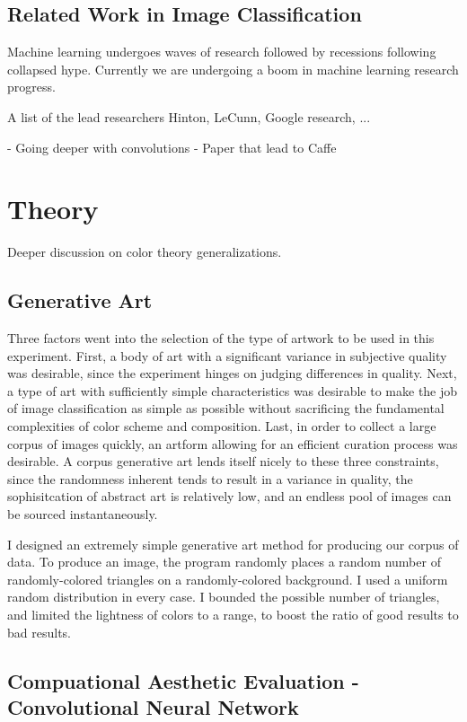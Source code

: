 \documentclass[midd]{thesis}
\begin{document}
\section{Related Work in Image Classification}

Machine learning undergoes waves of research followed by recessions following collapsed hype. Currently we are undergoing a boom in machine learning research progress.

A list of the lead researchers Hinton, LeCunn, Google research, ...

- Going deeper with convolutions
- Paper that lead to Caffe

\chapter{Theory}

Deeper discussion on color theory generalizations.

\section{Generative Art}

Three factors went into the selection of the type of artwork to be used in this experiment. First, a body of art with a significant variance in subjective quality was desirable, since the experiment hinges on judging differences in quality. Next, a type of art with sufficiently simple characteristics was desirable to make the job of image classification as simple as possible without sacrificing the fundamental complexities of color scheme and composition. Last, in order to collect a large corpus of images quickly, an artform allowing for an efficient curation process was desirable. A corpus generative art lends itself nicely to these three constraints, since the randomness inherent tends to result in a variance in quality, the sophisitcation of abstract art is relatively low, and an endless pool of images can be sourced instantaneously.

I designed an extremely simple generative art method for producing our corpus of data. To produce an image, the program randomly places a random number of randomly-colored triangles on a randomly-colored background. I used a uniform random distribution in every case. I bounded the possible number of triangles, and limited the lightness of colors to a range, to boost the ratio of good results to bad results.

\section{Compuational Aesthetic Evaluation - Convolutional Neural Network}
\end{document}
